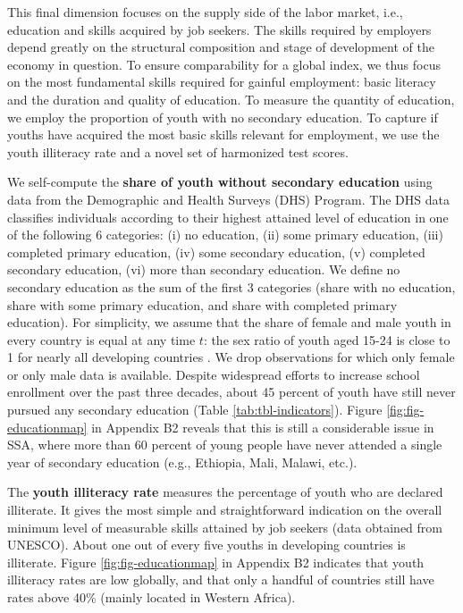 \documentclass[
  a4paper, twoside, 12pt]{book}
\begin{document}
This final dimension focuses on the supply side of the labor market, i.e., education and skills acquired by job seekers. The skills required by employers depend greatly on the structural composition and stage of development of the economy in question. To ensure comparability for a global index, we thus focus on the most fundamental skills required for gainful employment: basic literacy and the duration and quality of education. To measure the quantity of education, we employ the proportion of youth with no secondary education. To capture if youths have acquired the most basic skills relevant for employment, we use the youth illiteracy rate and a novel set of harmonized test scores.

We self-compute the \textbf{share of youth without secondary education} using data from the Demographic and Health Surveys (DHS) Program. The DHS data classifies individuals according to their highest attained level of education in one of the following 6 categories: (i) no education, (ii) some primary education, (iii) completed primary education, (iv) some secondary education, (v) completed secondary education, (vi) more than secondary education. We define no secondary education as the sum of the first 3 categories (share with no education, share with some primary education, and share with completed primary education). For simplicity, we assume that the share of female and male youth in every country is equal at any time \(t\): the sex ratio of youth aged 15-24 is close to 1 for nearly all developing countries \autocite{cia2016}. We drop observations for which only female or only male data is available. Despite widespread efforts to increase school enrollment over the past three decades, about 45 percent of youth have still never pursued any secondary education (Table \ref{tab:tbl-indicators}). Figure \ref{fig:fig-educationmap} in Appendix B2 reveals that this is still a considerable issue in SSA, where more than 60 percent of young people have never attended a single year of secondary education (e.g., Ethiopia, Mali, Malawi, etc.).

The \textbf{youth illiteracy rate} measures the percentage of youth who are declared illiterate. It gives the most simple and straightforward indication on the overall minimum level of measurable skills attained by job seekers (data obtained from UNESCO). About one out of every five youths in developing countries is illiterate. Figure \ref{fig:fig-educationmap} in Appendix B2 indicates that youth illiteracy rates are low globally, and that only a handful of countries still have rates above 40\% (mainly located in Western Africa).
\end{document}
